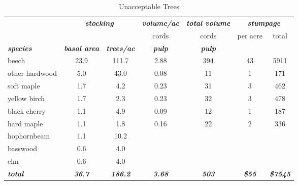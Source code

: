 \documentclass[landscape]{article}
\begin{document}
\begin{table}[H]

\caption{\label{tab:unnamed-chunk-64}Unacceptable Trees}
\fontsize{10}{12}\selectfont
\begin{tabular}[t]{lcccccc}
\toprule
\multicolumn{1}{c}{\em{\textbf{ }}} & \multicolumn{2}{c}{\em{\textbf{stocking}}} & \multicolumn{1}{c}{\em{\textbf{volume/ac }}} & \multicolumn{1}{c}{\em{\textbf{total volume}}} & \multicolumn{2}{c}{\em{\textbf{stumpage}}} \\
\cmidrule(l{3pt}r{3pt}){2-3} \cmidrule(l{3pt}r{3pt}){4-4} \cmidrule(l{3pt}r{3pt}){5-5} \cmidrule(l{3pt}r{3pt}){6-7}
\multicolumn{3}{c}{ } & \multicolumn{1}{c}{cords} & \multicolumn{1}{c}{cords} & \multicolumn{1}{c}{per acre} & \multicolumn{1}{c}{total} \\
\cmidrule(l{3pt}r{3pt}){4-4} \cmidrule(l{3pt}r{3pt}){5-5} \cmidrule(l{3pt}r{3pt}){6-6} \cmidrule(l{3pt}r{3pt}){7-7}
\rowcolor[HTML]{DCDCDC}  \em{\textbf{species}} & \em{\textbf{basal area}} & \em{\textbf{trees/ac}} & \em{\textbf{pulp}} & \em{\textbf{pulp}} & \em{\textbf{ }} & \em{\textbf{ }}\\
\midrule
\rowcolor{gray!6}  beech & 23.9 & 111.7 & 2.88 & 394 & 43 & 5911\\
 
other hardwood & 5.0 & 43.0 & 0.08 & 11 & 1 & 171\\
 
\rowcolor{gray!6}  soft maple & 1.7 & 4.2 & 0.23 & 31 & 3 & 462\\
 
yellow birch & 1.7 & 2.3 & 0.23 & 32 & 3 & 478\\
 
\rowcolor{gray!6}  black cherry & 1.1 & 4.9 & 0.09 & 12 & 1 & 187\\
 
hard maple & 1.1 & 1.8 & 0.16 & 22 & 2 & 336\\
 
\rowcolor{gray!6}  hophornbeam & 1.1 & 10.2 &  &  &  & \\
 
basswood & 0.6 & 4.0 &  &  &  & \\
 
\rowcolor{gray!6}  elm & 0.6 & 4.0 &  &  &  & \\
 
\rowcolor[HTML]{DCDCDC}  \em{\textbf{total}} & \em{\textbf{36.7}} & \em{\textbf{186.2}} & \em{\textbf{3.68}} & \em{\textbf{503}} & \em{\textbf{\$55}} & \em{\textbf{\$7545}}\\
\bottomrule
\end{tabular}
\end{table}
\end{document}
